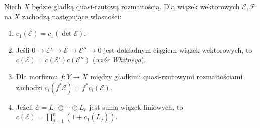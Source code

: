 \begin{twierdzenie}
\label{tw:ga7-chern-axioms}
Niech $X$ będzie gładką quasi-rzutową rozmaitością.
Dla wiązek wektorowych $\mathcal E,\mathcal F$ na $X$
zachodzą następujące własności:
\begin{enumerate}[label=(\roman*)]
\item $c_1(\mathcal E)=c_1(\det\mathcal E)$.
\item Jeśli $0\to\mathcal E'\to\mathcal E\to\mathcal E''\to0$
      jest dokładnym ciągiem wiązek wektorowych, to
      $c(\mathcal E)=c(\mathcal E')c(\mathcal E'')$
      (\emph{wzór Whitneya}).
\item Dla morfizmu $f:Y\to X$ między gładkimi
      quasi-rzutowymi rozmaitościami zachodzi
      $c_i(f^*\mathcal E)=f^*c_i(\mathcal E)$.
\item Jeżeli $\mathcal E=L_1\oplus\cdots\oplus L_r$
      jest sumą wiązek liniowych, to
      $c(\mathcal E)=\prod_{j=1}^r(1+c_1(L_j))$.
\end{enumerate}
\end{twierdzenie}
